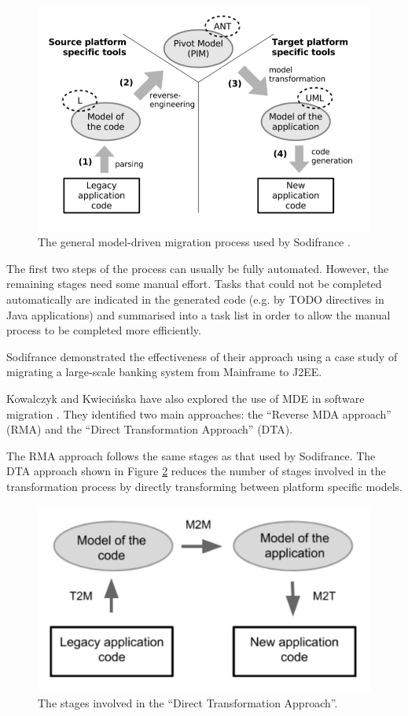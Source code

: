 \documentclass{UoYCSproject}
\begin{document}
\begin{figure}[h!]
  \centering
  \includegraphics[width=0.6\linewidth]{graphics/sodifrance_mde.png}
  \caption{The general model-driven migration process used by Sodifrance \parencite{fleurey2007model}.}
  \label{fig:sodifrance_process}
\end{figure}

The first two steps of the process can usually be fully automated. However, the remaining stages need some manual effort. Tasks that could not be completed automatically are indicated in the generated code (e.g. by TODO directives in Java applications) and summarised into a task list in order to allow the manual process to be completed more efficiently.

Sodifrance demonstrated the effectiveness of their approach using a case study of migrating a large-scale banking system from Mainframe to J2EE.

Kowalczyk and Kwieci\'nska have also explored the use of MDE in software migration \parencite{kowalczyk2009model}. They identified two main approaches: the ``Reverse MDA approach'' (RMA) and the ``Direct Transformation Approach'' (DTA).

The RMA approach follows the same stages as that used by Sodifrance. The DTA approach shown in Figure \ref{fig:dta} reduces the number of stages involved in the transformation process by directly transforming between platform specific models. 

\begin{figure}[h!]
  \centering
  \includegraphics[width=0.6\linewidth]{graphics/dta.png}
  \caption{The stages involved in the ``Direct Transformation Approach''.}
  \label{fig:dta}
\end{figure}
\end{document}
